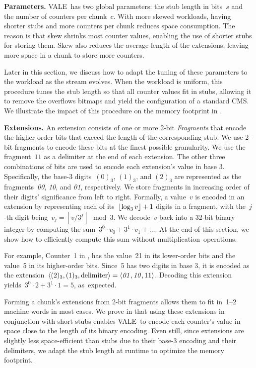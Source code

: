 \documentclass[sigconf]{acmart}
\newcommand{\counterencodingabbrv}{VALE}
\begin{document}
\textbf{Parameters.}
\counterencodingabbrv\ has two global parameters: the stub length in bits~$s$
and the number of counters per chunk~$c$. With more skewed workloads, having
shorter stubs and more counters per chunk reduces space consumption. The reason
is that skew shrinks most counter values, enabling the use of shorter stubs for
storing them. Skew also reduces the average length of the extensions, leaving
more space in a chunk to store more counters.

Later in this section, we discuss how to adapt the tuning of these parameters
to the workload as the stream evolves. When the workload is uniform, this
procedure tunes the stub length so that all counter values fit in stubs,
allowing it to remove the overflows bitmaps and yield the configuration of a
standard CMS. We illustrate the impact of this procedure on the memory
footprint in .

\textbf{Extensions.}
An extension consists of one or more 2{\nobreakdash-}bit \emph{Fragments} that
encode the higher-order bits that exceed the length of the corresponding stub.
We use 2{\nobreakdash-}bit fragments to encode these bits at the finest possible granularity.
We use the fragment~$11$ as a delimiter at the end
of each extension. The other three combinations of bits are used to encode each
extension's value in base 3. Specifically, the base{\nobreakdash-}3
digits~$(0)_3$, $(1)_3$, and $(2)_3$ are represented as the
fragments~\textit{00}, \textit{10}, and \textit{01}, respectively. We store
fragments in increasing order of their digits' significance from left to right.
Formally, a value~$v$ is encoded in an extension by representing each of
its~$\left\lfloor \log_3 v \right\rfloor + \nolinebreak 1$ digits in a
fragment, with the~$j${\nobreakdash-}th digit being~\mbox{$v_j=\left\lfloor
v/3^j \right\rfloor \mod 3$}. We decode~$v$ back into a 32-bit binary integer
by computing the sum~$3^0 \cdot v_0 + 3^1 \cdot v_1 + \dots$. At the end of
this section, we show how to efficiently compute this sum without
multiplication~operations.

For example, Counter~1 in
,
has the value~21 in its lower-order bits and the value~5 in its higher-order
bits. Since~5 has two digits in base 3, it is encoded as the extension~$\langle
(2)_3, (1)_3, \text{delimiter} \rangle=\langle \text{\textit{01}},
\text{\textit{10}}, 11 \rangle$. Decoding this extension yields~$3^0 \cdot 2 +
3^1 \cdot 1 = 5$, \mbox{as expected}.

Forming a chunk's extensions from 2-bit fragments allows them to fit in~1--2
machine words in most cases. We prove in 
that using these extensions in conjunction with
short stubs enables \counterencodingabbrv\ to encode each counter's value in
space close to the length of its binary encoding. Even still, since extensions
are slightly less space-efficient than stubs due to their base{\nobreakdash-}3
encoding and their delimiters, we adapt the stub length at runtime to optimize
the memory footprint.
\end{document}
